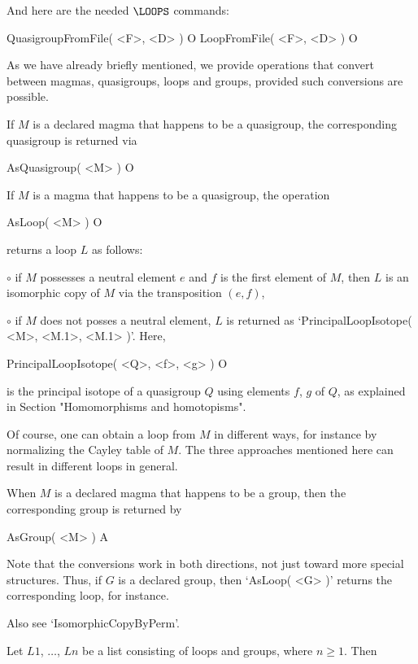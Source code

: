 \medskip

And here are the needed ${\LOOPS}$ commands:

\>QuasigroupFromFile( <F>, <D> ) O
\>LoopFromFile( <F>, <D> ) O


As we have already briefly mentioned, we provide operations that convert
between magmas, quasigroups, loops and groups, provided such conversions are
possible.

If $M$ is a declared magma that happens to be a quasigroup, the corresponding
quasigroup is returned via

\>AsQuasigroup( <M> ) O

If $M$ is a magma that happens to be a quasigroup, the operation

\>AsLoop( <M> ) O

returns a loop $L$ as follows:
\beginlist%
\item{$\circ$}
    if $M$ possesses a neutral element $e$ and $f$ is the first element of $M$,
    then $L$ is an isomorphic copy of $M$ via the transposition $(e,f)$,
\item{$\circ$}
    if $M$ does not posses a neutral element, $L$ is returned as
    `PrincipalLoopIsotope( <M>, <M.1>, <M.1> )'.
\endlist
Here,

\>PrincipalLoopIsotope( <Q>, <f>, <g> ) O

is the principal isotope of a quasigroup $Q$ using elements $f$, $g$ of $Q$, as
explained in Section "Homomorphisms and homotopisms".

Of course, one can obtain a loop from $M$ in different ways, for instance by
normalizing the Cayley table of $M$. The three approaches mentioned here can
result in different loops in general.

When $M$ is a declared magma that happens to be a group, then the corresponding
group is returned by

\>AsGroup( <M> ) A

Note that the conversions work in both directions, not just toward more special
structures. Thus, if $G$ is a declared group, then `AsLoop( <G> )' returns the
corresponding loop, for instance.

Also see `IsomorphicCopyByPerm'.


\noindent Let $L1$, $\dots$, $Ln$ be a list consisting of loops and groups,
where $n\ge 1$. Then

